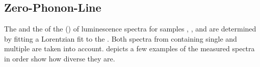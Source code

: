 	\FloatBarrier	

\subsection{Zero-Phonon-Line}\label{subsec::zpl}

	The \cwl and the \lw of the \zpl (\ZPL) of \siv luminescence spectra for samples \insituF, \insituS, and \insituH are determined by fitting a Lorentzian fit to the \ZPL.
	Both spectra from \nds containing single and multiple \sivs are taken into account.
	 depicts a few examples of the measured spectra in order show how diverse they are.

	\begin{figure}[!htb]
		\begin{subfigure}[t]{ 0.49\linewidth}
			\centering
			\caption{}
			\label{subfig::spectrum_1}
		\end{subfigure}
		\hfill
		\begin{subfigure}[t]{ 0.49\linewidth}
			\centering

\end{subfigure}
\end{figure}
